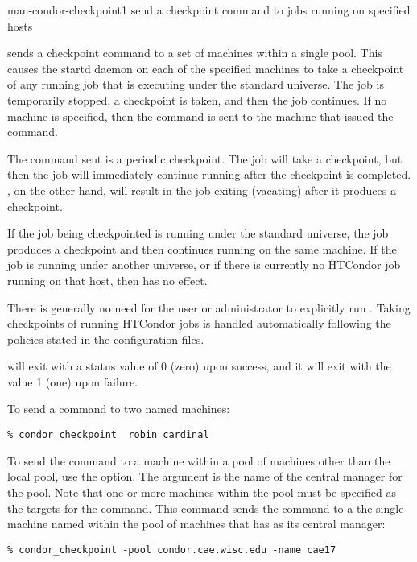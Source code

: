 \begin{ManPage}{}{man-condor-checkpoint}{1}
{send a checkpoint command to jobs running on specified hosts}

\Synopsis {}
\ToolArgsBase

\ToolDebugOption
\ToolWhere

\Description
{} sends a checkpoint command to a set
of machines within a single pool.
This causes the startd daemon on each of the specified machines
to take a checkpoint of any running job that is executing under
the standard universe.
The job is temporarily stopped, a checkpoint is taken,
and then the job continues.
If no machine is specified, then the command
is sent to the machine that issued the
 command.

The command sent is a periodic checkpoint.
The job will take a checkpoint, but then the job will immediately
continue running after the checkpoint is completed.
, on the other hand, will result in the job exiting
(vacating) after it produces a checkpoint. 

If the job being checkpointed is running under the standard universe,
the job produces a checkpoint and then continues running
on the same machine.
If the job is running under another universe,
or if there is currently no HTCondor job
running on that host, then  has no effect. 

There is generally no need for the user or administrator to explicitly
run .
Taking checkpoints of running HTCondor jobs is
handled automatically following the policies
stated in the configuration files. 

\begin{Options}
	\ToolArgsBaseDesc
	\ToolDebugDesc
	\ToolArgsLocateDesc
\end{Options}

\ExitStatus

 will exit with a status value of 0 (zero) upon success,
and it will exit with the value 1 (one) upon failure.

\Examples
To send a  command to two named machines:
\begin{verbatim}
% condor_checkpoint  robin cardinal
\end{verbatim}

To send the  command to a machine
within a pool of machines other than the local pool,
use the  option.
The argument is the name of the central manager for the pool.
Note that one or more machines within the pool must be
specified as the targets for the command.
This command sends the command to
a the single machine named  within the
pool of machines that has  as
its central manager:
\begin{verbatim}
% condor_checkpoint -pool condor.cae.wisc.edu -name cae17
\end{verbatim}

\end{ManPage}
